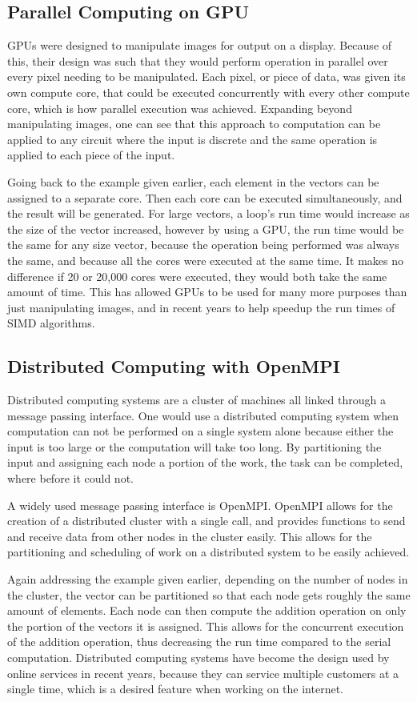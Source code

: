 \subsection{Parallel Computing on GPU}
GPUs were designed to manipulate images for output on a display. Because of this, their design was such that they would perform operation in parallel over every pixel needing to be manipulated. Each pixel, or piece of data, was given its own compute core, that could be executed concurrently with every other compute core, which is how parallel execution was achieved. Expanding beyond manipulating images, one can see that this approach to computation can be applied to any circuit where the input is discrete and the same operation is applied to each piece of the input. 

Going back to the example given earlier, each element in the vectors can be assigned to a separate core. Then each core can be executed simultaneously, and the result will be generated. For large vectors, a loop's run time would increase as the size of the vector increased, however by using a GPU, the run time would be the same for any size vector, because the operation being performed was always the same, and because all the cores were executed at the same time. It makes no difference if 20 or 20,000 cores were executed, they would both take the same amount of time. This has allowed GPUs to be used for many more purposes than just manipulating images, and in recent years to help speedup the run times of SIMD algorithms.

\subsection{Distributed Computing with OpenMPI}
Distributed computing systems are a cluster of machines all linked through a message passing interface. One would use a distributed computing system when computation can not be performed on a single system alone because either the input is too large or the computation will take too long. By partitioning the input and assigning each node a portion of the work, the task can be completed, where before it could not.

A widely used message passing interface is OpenMPI. OpenMPI allows for the creation of a distributed cluster with a single call, and provides functions to send and receive data from other nodes in the cluster easily. This allows for the partitioning and scheduling of work on a distributed system to be easily achieved.

Again addressing the example given earlier, depending on the number of nodes in the cluster, the vector can be partitioned so that each node gets roughly the same amount of elements. Each node can then compute the addition operation on only the portion of the vectors it is assigned. This allows for the concurrent execution of the addition operation, thus decreasing the run time compared to the serial computation. Distributed computing systems have become the design used by online services in recent years, because they can service multiple customers at a single time, which is a desired feature when working on the internet.